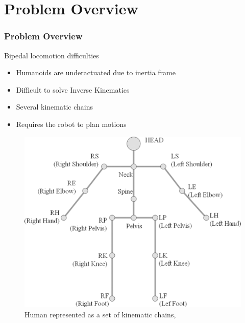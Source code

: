 \documentclass{beamer}
\begin{document}
	\section*{Problem Overview}
		\begin{frame}
			\frametitle{Problem Overview}
			\begin{block}{Bipedal locomotion difficulties}
				\begin{itemize}
					\item
						Humanoids are underactuated due to inertia frame
					\item
						Difficult to solve Inverse Kinematics
					\item
						Several kinematic chains
					\item 
						Requires the robot to plan motions
				\end{itemize}
			\end{block}
			
			\begin{figure}[h!]
				\begin{minipage}[H]{\linewidth}
					\centering
					\includegraphics[scale=0.5]{presentation_images/7}
					\caption{Human represented as a set of kinematic chains, \cite{seo2011improved}}
				\end{minipage}
			\end{figure}
		\end{frame}

\end{document}
